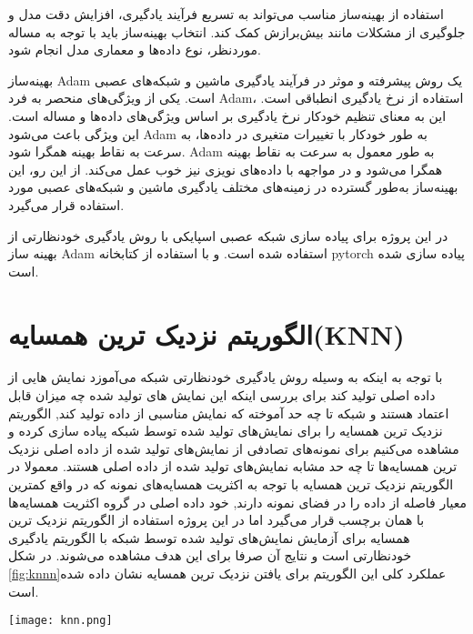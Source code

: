 استفاده از بهینه‌ساز مناسب می‌تواند به تسریع فرآیند یادگیری، افزایش دقت مدل و جلوگیری از مشکلات مانند بیش‌برازش کمک کند. انتخاب بهینه‌ساز باید با توجه به مساله موردنظر، نوع داده‌ها و معماری مدل انجام شود.

بهینه‌ساز Adam یک روش پیشرفته و موثر در فرآیند یادگیری ماشین و شبکه‌های عصبی است. 
یکی از ویژگی‌های منحصر به فرد Adam، استفاده از نرخ یادگیری انطباقی است. این به معنای تنظیم خودکار نرخ یادگیری بر اساس ویژگی‌های داده‌ها و مساله است. این ویژگی باعث می‌شود Adam به طور خودکار با تغییرات متغیری در داده‌ها، به سرعت به نقاط بهینه همگرا شود.
Adam به طور معمول به سرعت به نقاط بهینه همگرا می‌شود و در مواجهه با داده‌های نویزی نیز خوب عمل می‌کند. از این رو، این بهینه‌ساز به‌طور گسترده در زمینه‌های مختلف یادگیری ماشین و شبکه‌های عصبی مورد استفاده قرار می‌گیرد.

در این پروژه برای پیاده سازی شبکه عصبی اسپایکی با روش یادگیری خودنظارتی از بهینه ساز Adam استفاده شده است. و با استفاده از کتابخانه pytorch پیاده سازی شده است.
\citep{kingma2014adam}

\section{الگوریتم نزدیک ترین همسایه(KNN) }

با توجه به اینکه به وسیله روش یادگیری خودنظارتی شبکه می‌آموزد نمایش هایی از داده اصلی تولید کند برای بررسی اینکه این نمایش های تولید شده چه میزان قابل اعتماد هستند و شبکه تا چه حد آموخته که نمایش مناسبی از داده تولید کند, الگوریتم نزدیک ترین همسایه را برای نمایش‌های تولید شده توسط شبکه پیاده سازی کرده و مشاهده می‌کنیم برای نمونه‌های تصادفی از نمایش‌های تولید شده از داده اصلی نزدیک ترین همسایه‌ها تا چه حد مشابه نمایش‌های تولید شده از داده اصلی هستند. معمولا در الگوریتم نزدیک ترین همسایه با توجه به اکثریت همسایه‌های نمونه که در واقع کمترین معیار فاصله از داده را در فضای نمونه دارند, خود داده اصلی در گروه اکثریت همسایه‌ها با همان برچسب قرار می‌گیرد اما در این پروژه استفاده از الگوریتم نزدیک ترین همسایه برای آزمایش نمایش‌های تولید شده توسط شبکه با الگوریتم یادگیری خودنظارتی است و نتایج آن صرفا برای این هدف مشاهده می‌شوند. در شکل  \ref{fig:knnn}عملکرد کلی این الگوریتم برای یافتن نزدیک ترین همسایه نشان داده شده است.
\citep{guo2003knn}


\begin{minipage}{\linewidth}
	\centering
	\texttt{[image: knn.png]}
	\captionsetup{font=small} %
	\captionsetup{font=small} %
	\label{fig:knnn}
\end{minipage}


